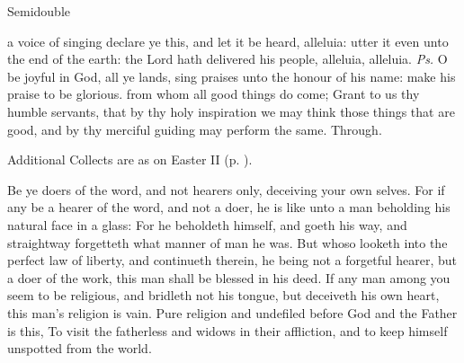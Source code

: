 \begin{inhead}
    {Semidouble}
\end{inhead}
\par\noindent
{}


\properantiphonfix

\introit
{} a voice of singing declare ye this, and let it be heard, alleluia: utter it even unto the end of the earth: the Lord hath delivered his people, alleluia, alleluia. \textit{Ps.} O be joyful in God, all ye lands, sing praises unto the honour of his name: make his praise to be glorious.
\collect
{} from whom all good things do come; Grant to us thy humble servants, that by thy holy inspiration we may think those things that are good, and by thy merciful guiding may perform the same. Through.
\begin{rubric}
    Additional Collects are as on Easter II (p. \pageref{EasterIICollect}).
\end{rubric}
 Be ye doers of the word, and not hearers only, deceiving your own selves. For if any be a hearer of the word, and not a doer, he is like unto a man beholding his natural face in a glass: For he beholdeth himself, and goeth his way, and straightway forgetteth what manner of man he was. But whoso looketh into the perfect law of liberty, and continueth therein, he being not a forgetful hearer, but a doer of the work, this man shall be blessed in his deed. If any man among you seem to be religious, and bridleth not his tongue, but deceiveth his own heart, this man's religion is vain. Pure religion and undefiled before God and the Father is this, To visit the fatherless and widows in their affliction, and to keep himself unspotted from the world.

